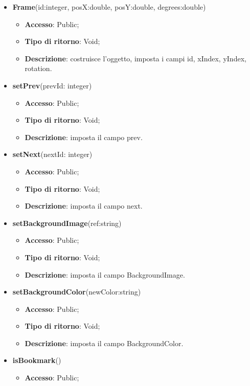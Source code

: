 {{		
		\begin{itemize}
			\item \textbf{Frame}(id:integer, posX:double, posY:double, degrees:double)
			\begin{itemize}
				\item \textbf{Accesso}: Public;
				\item \textbf{Tipo di ritorno}: Void;
				\item \textbf{Descrizione}: costruisce l’oggetto, imposta i campi id, xIndex, yIndex, rotation.
			\end{itemize}
			\item \textbf{setPrev}(prevId: integer)
			\begin{itemize}
				\item \textbf{Accesso}: Public;
				\item \textbf{Tipo di ritorno}: Void;
				\item \textbf{Descrizione}: imposta il campo prev.
			\end{itemize}
			\item \textbf{setNext}(nextId: integer)
			\begin{itemize}
				\item \textbf{Accesso}: Public;
				\item \textbf{Tipo di ritorno}: Void;
				\item \textbf{Descrizione}: imposta il campo next.
			\end{itemize}
			\item \textbf{setBackgroundImage}(ref:string)
			\begin{itemize}
				\item \textbf{Accesso}: Public;
				\item \textbf{Tipo di ritorno}: Void;
				\item \textbf{Descrizione}: imposta il campo BackgroundImage.
			\end{itemize}
			\item \textbf{setBackgroundColor}(newColor:string)
			\begin{itemize}
				\item \textbf{Accesso}: Public;
				\item \textbf{Tipo di ritorno}: Void;
				\item \textbf{Descrizione}: imposta il campo BackgroundColor.
			\end{itemize}
			\item \textbf{isBookmark}()
			\begin{itemize}
				\item \textbf{Accesso}: Public;

\end{itemize}
\end{itemize}}}
